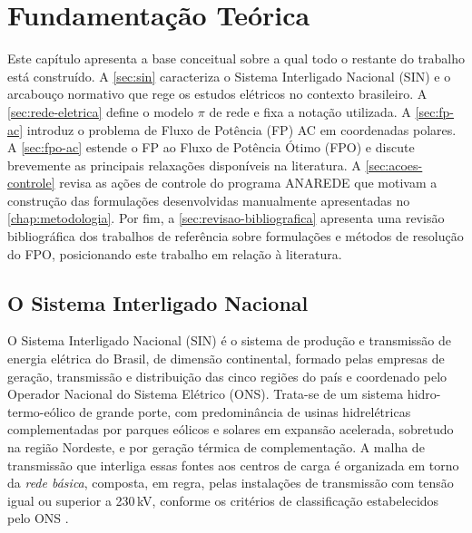 \chapter{Fundamentação Teórica}
\label{cap:fundamentacao-teorica}

Este capítulo apresenta a base conceitual sobre a qual todo o restante do trabalho está construído. A \autoref{sec:sin} caracteriza o Sistema Interligado Nacional (SIN) e o arcabouço normativo que rege os estudos elétricos no contexto brasileiro. A \autoref{sec:rede-eletrica} define o modelo $\pi$ de rede e fixa a notação utilizada. A \autoref{sec:fp-ac} introduz o problema de Fluxo de Potência (FP) AC em coordenadas polares. A \autoref{sec:fpo-ac} estende o FP ao Fluxo de Potência Ótimo (FPO) e discute brevemente as principais relaxações disponíveis na literatura. A \autoref{sec:acoes-controle} revisa as ações de controle do programa ANAREDE que motivam a construção das formulações desenvolvidas manualmente apresentadas no \autoref{chap:metodologia}. Por fim, a \autoref{sec:revisao-bibliografica} apresenta uma revisão bibliográfica dos trabalhos de referência sobre formulações e métodos de resolução do FPO, posicionando este trabalho em relação à literatura.

\section{O Sistema Interligado Nacional}
\label{sec:sin}

O Sistema Interligado Nacional (SIN) é o sistema de produção e transmissão de energia elétrica do Brasil, de dimensão continental, formado pelas empresas de geração, transmissão e distribuição das cinco regiões do país e coordenado pelo Operador Nacional do Sistema Elétrico (ONS). Trata-se de um sistema hidro-termo-eólico de grande porte, com predominância de usinas hidrelétricas complementadas por parques eólicos e solares em expansão acelerada, sobretudo na região Nordeste, e por geração térmica de complementação. A malha de transmissão que interliga essas fontes aos centros de carga é organizada em torno da \emph{rede básica}, composta, em regra, pelas instalações de transmissão com tensão igual ou superior a 230\,kV, conforme os critérios de classificação estabelecidos pelo ONS \cite{ons2024sm21}.

